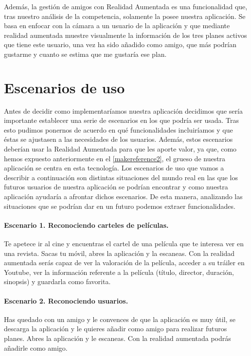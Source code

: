 Además, la gestión de amigos con Realidad Aumentada es una funcionalidad que, tras nuestro análisis de la competencia, solamente la posee nuestra aplicación. 
Se basa en enfocar con la cámara a un usuario de la aplicación y que mediante realidad aumentada muestre visualmente la información de los tres 
 planes activos que tiene este usuario, una vez ha sido añadido como amigo, que más podrían gustarme y cuanto se estima que me gustaría ese plan.
    
\section{Escenarios de uso}
\label{makereference3.2}
Antes de decidir como implementaríamos nuestra aplicación decidimos que sería importante establecer una serie
de escenarios en los que podría ser usada. Tras esto pudimos ponernos de acuerdo en qué funcionalidades incluiríamos y que 
éstas se ajustasen a las necesidades de los usuarios. Además, estos escenarios deberían usar la Realidad Aumentada para que 
les aporte valor, ya que, como hemos expuesto anteriormente en el \autoref{makereference2}, el grueso de nuestra aplicación se centra en esta tecnología.
Los escenarios de uso que vamos a describir a continuación son distintas situaciones del mundo real en las que los futuros usuarios de nuestra aplicación se podrían encontrar y como nuestra aplicación ayudaría a afrontar dichos escenarios. 
De esta manera, analizando las situaciones que se podrían dar en un futuro podemos extraer funcionalidades.

\paragraph{Escenario 1. Reconociendo carteles de películas.}
    Te apetece ir al cine y encuentras el cartel de una película que te interesa ver en una revista. Sacas tu móvil, abres la aplicación y 
    la escaneas. Con la realidad aumentada serás capaz de ver la valoración de la película, acceder a su tráiler en Youtube, ver la información
    referente a la película (título, director, duración, sinopsis) y guardarla como favorita.
    
\paragraph{Escenario 2. Reconociendo usuarios.}
    Has quedado con un amigo y le convences de que la aplicación es muy útil, se descarga la aplicación y le quieres añadir como amigo para realizar futuros planes. Abres la aplicación y le escaneas. Con la realidad aumentada podrás añadirle como amigo.

